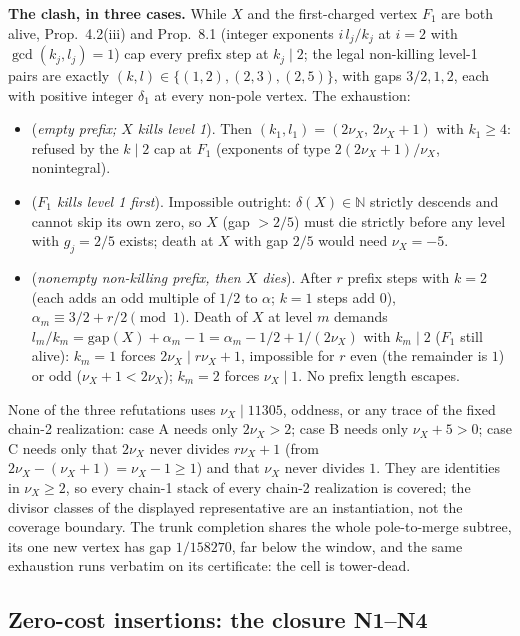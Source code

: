 \documentclass[11pt]{article}
\theoremstyle{definition}
\theoremstyle{remark}
\begin{document}
\medskip
\noindent\textbf{The clash, in three cases.} While $X$ and the first-charged vertex $F_1$ are both alive, Prop.~4.2(iii) and Prop.~8.1 (integer exponents $i\,l_j/k_j$ at $i=2$ with $\gcd(k_j,l_j)=1$) cap every prefix step at $k_j\mid2$; the legal non-killing level-1 pairs are exactly $(k,l)\in\{(1,2),(2,3),(2,5)\}$, with gaps $3/2,1,2$, each with positive integer $\delta_1$ at every non-pole vertex. The exhaustion:
\begin{itemize}
\item[\textbf{A}] (\emph{empty prefix; $X$ kills level 1}). Then $(k_1,l_1)=(2\nu_X,\,2\nu_X+1)$ with $k_1\geq4$: refused by the $k\mid2$ cap at $F_1$ (exponents of type $2(2\nu_X+1)/\nu_X$, nonintegral).
\item[\textbf{B}] (\emph{$F_1$ kills level 1 first}). Impossible outright: $\delta(X)\in\mathbb{N}$ strictly descends and cannot skip its own zero, so $X$ (gap $>2/5$) must die strictly before any level with $g_j=2/5$ exists; death at $X$ with gap $2/5$ would need $\nu_X=-5$.
\item[\textbf{C}] (\emph{nonempty non-killing prefix, then $X$ dies}). After $r$ prefix steps with $k=2$ (each adds an odd multiple of $1/2$ to $\alpha$; $k=1$ steps add $0$), $\alpha_m\equiv3/2+r/2\pmod 1$. Death of $X$ at level $m$ demands $l_m/k_m=\mathrm{gap}(X)+\alpha_m-1=\alpha_m-1/2+1/(2\nu_X)$ with $k_m\mid2$ ($F_1$ still alive): $k_m=1$ forces $2\nu_X\mid r\nu_X+1$, impossible for $r$ even (the remainder is $1$) or odd ($\nu_X+1<2\nu_X$); $k_m=2$ forces $\nu_X\mid1$. No prefix length escapes.
\end{itemize}
None of the three refutations uses $\nu_X\mid11305$, oddness, or any trace of the fixed chain-2 realization: case A needs only $2\nu_X>2$; case B needs only $\nu_X+5>0$; case C needs only that $2\nu_X$ never divides $r\nu_X+1$ (from $2\nu_X-(\nu_X+1)=\nu_X-1\geq1$) and that $\nu_X$ never divides $1$. They are identities in $\nu_X\geq2$, so every chain-1 stack of every chain-2 realization is covered; the divisor classes of the displayed representative are an instantiation, not the coverage boundary. The trunk completion shares the whole pole-to-merge subtree, its one new vertex has gap $1/158270$, far below the window, and the same exhaustion runs verbatim on its certificate: the cell is tower-dead.

\subsection{Zero-cost insertions: the closure N1--N4}\label{sec:insertions}
\end{document}
